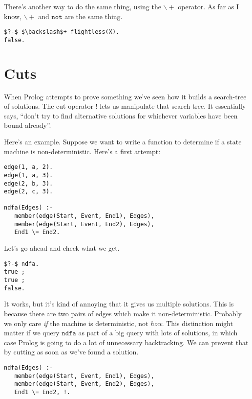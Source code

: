 \documentclass[a4paper,12pt]{article}
\newcommand{\kwa}[1]{\mathtt{#1}}
\begin{document}
\noindent
There's another way to do the same thing, using the $\kwa{ \backslash +}$ operator. As far as I know, $\kwa{ \backslash +}$ and $\kwa{not}$ are the same thing.

\begin{lstlisting}
$?-$ $\backslash$+ flightless(X).
false.
\end{lstlisting}


\section{Cuts}

\noindent
When Prolog attempts to prove something we've seen how it builds a search-tree of solutions. The cut operator $!$ lets us manipulate that search tree. It essentially says, ``don't try to find alternative solutions for whichever variables have been bound already''.

\noindent
Here's an example. Suppose we want to write a function to determine if a state machine is non-deterministic. Here's a first attempt:

\begin{lstlisting}
edge(1, a, 2).
edge(1, a, 3).
edge(2, b, 3).
edge(2, c, 3).

ndfa(Edges) :-
   member(edge(Start, Event, End1), Edges),
   member(edge(Start, Event, End2), Edges),
   End1 \= End2.

\end{lstlisting}

\noindent
Let's go ahead and check what we get.

\begin{lstlisting}
$?-$ ndfa.
true ;
true ;
false.
\end{lstlisting}

\noindent
It works, but it's kind of annoying that it gives us multiple solutions. This is because there are two pairs of edges which make it non-deterministic. Probably we only care \textit{if} the machine is deterministic, not \textit{how}. This distinction might matter if we query $\kwa{ndfa}$ as part of a big query with lots of solutions, in which case Prolog is going to do a lot of unnecessary backtracking. We can prevent that by cutting as soon as we've found a solution.

\begin{lstlisting}
ndfa(Edges) :-
   member(edge(Start, Event, End1), Edges),
   member(edge(Start, Event, End2), Edges),
   End1 \= End2, !.
\end{lstlisting}
\end{document}
